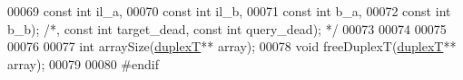 \begin{DoxyCode}
00069                           \textcolor{keyword}{const} \textcolor{keywordtype}{int} il\_a,
00070                           \textcolor{keyword}{const} \textcolor{keywordtype}{int} il\_b,
00071                           \textcolor{keyword}{const} \textcolor{keywordtype}{int} b\_a,
00072                           \textcolor{keyword}{const} \textcolor{keywordtype}{int} b\_b); \textcolor{comment}{/*, const int target\_dead, const int query\_dead); */}
00073 
00074 
00075 
00076 
00077 \textcolor{keywordtype}{int}      arraySize(\hyperlink{group__data__structures_structduplexT}{duplexT}** array);
00078 \textcolor{keywordtype}{void}     freeDuplexT(\hyperlink{group__data__structures_structduplexT}{duplexT}** array);
00079 
00080 \textcolor{preprocessor}{#endif}
\end{DoxyCode}
